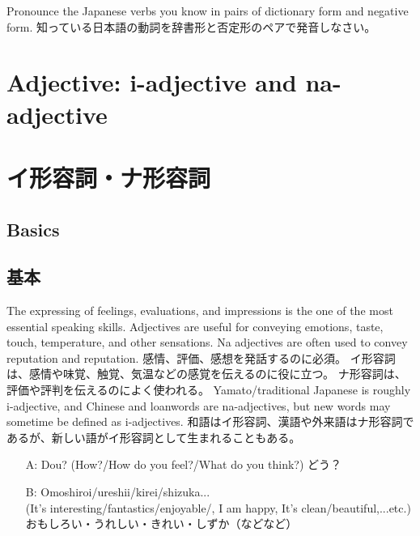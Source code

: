 \documentclass[uplatex,dvipdfmx,b5paper,english,10pt]{jsbook}
\begin{document}
\begin{toiquestion}
\ifEnglish
Pronounce the Japanese verbs you know in pairs of dictionary form and negative form.
\else
知っている日本語の動詞を辞書形と否定形のペアで発音しなさい。
\fi
\end{toiquestion}

\ifEnglish
\section{Adjective: i-adjective and na-adjective}
\else
\section{イ形容詞・ナ形容詞}
\fi

\ifEnglish
\subsection{Basics}
\else
\subsection{基本}
\fi
\ifEnglish
The expressing of feelings, evaluations, and impressions is the one of the most essential speaking skills.
Adjectives are useful for conveying emotions, taste, touch, temperature, and other sensations.
Na adjectives are often used to convey reputation and reputation.
\else
感情、評価、感想を発話するのに必須。
イ形容詞は、感情や味覚、触覚、気温などの感覚を伝えるのに役に立つ。
ナ形容詞は、評価や評判を伝えるのによく使われる。
\fi
\ifEnglish
Yamato/traditional Japanese is roughly i-adjective, and Chinese and loanwords are na-adjectives, but new words may sometime be defined as i-adjectives.
\else
和語はイ形容詞、漢語や外来語はナ形容詞であるが、新しい語がイ形容詞として生まれることもある。
\fi

\begin{itemize}
  \item[A:]
    \ifEnglish
    Dou?  (How?/How do you feel?/What do you think?)
    \else
    どう？
    \fi
  \item[B:]
    \ifEnglish
    Omoshiroi/ureshii/kirei/shizuka...\\
    (It's interesting/fantastics/enjoyable/, I am happy, It's clean/beautiful,...etc.)
    \else
    おもしろい・うれしい・きれい・しずか（などなど）
    \fi
\end{itemize}
\end{document}
